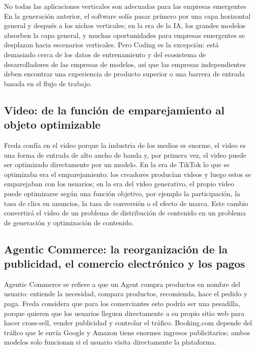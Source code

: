 \begin{warningbox}{No todas las aplicaciones verticales son adecuadas para las empresas emergentes}
En la generación anterior, el software solía pasar primero por una capa horizontal general y después a los nichos verticales; en la era de la IA, los grandes modelos absorben la capa general, y muchas oportunidades para empresas emergentes se desplazan hacia escenarios verticales. Pero Coding es la excepción: está demasiado cerca de los datos de entrenamiento y del ecosistema de desarrolladores de las empresas de modelos, así que las empresas independientes deben encontrar una experiencia de producto superior o una barrera de entrada basada en el flujo de trabajo.
\end{warningbox}

\subsection{Video: de la función de emparejamiento al objeto optimizable}

Freda confía en el video porque la industria de los medios es enorme, el video es una forma de entrada de alto ancho de banda y, por primera vez, el video puede ser optimizado directamente por un modelo. En la era de TikTok lo que se optimizaba era el emparejamiento: los creadores producían videos y luego estos se emparejaban con los usuarios; en la era del video generativo, el propio video puede optimizarse según una función objetivo, por ejemplo la participación, la tasa de clics en anuncios, la tasa de conversión o el efecto de marca. Este cambio convertirá el video de un problema de distribución de contenido en un problema de generación y optimización de contenido.

\subsection{Agentic Commerce: la reorganización de la publicidad, el comercio electrónico y los pagos}

Agentic Commerce se refiere a que un Agent compra productos en nombre del usuario: entiende la necesidad, compara productos, recomienda, hace el pedido y paga. Freda considera que para los comerciantes esto podría ser una pesadilla, porque quieren que los usuarios lleguen directamente a su propio sitio web para hacer cross-sell, vender publicidad y controlar el tráfico. Booking.com depende del tráfico que le envía Google y Amazon tiene enormes ingresos publicitarios; ambos modelos solo funcionan si el usuario visita directamente la plataforma.


